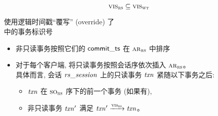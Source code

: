 \begin{frame}{}
  \begin{lemma}
	\[
	  \textsc{vis}_{\textsc{rs}} \subseteq \textsc{vis}_{\textsc{wt}}
	\]
  \end{lemma}

  \vspace{0.50cm}
  \begin{center}
	\rsalg{} 使用逻辑时间戳``覆写'' (override) 了 \\[5pt]
	\wtalg{} 中的事务标识号
  \end{center}
\end{frame}

\begin{frame}{}
  \begin{definition}
	\begin{itemize}
	  \setlength{\itemsep}{10pt}
	  \item 非只读事务按照它们的 ${\sf commit\_ts}$ 在 $\textsc{ar}_{\textsc{rs}}$ 中排序
	  \item 对于每个客户端, 将只读事务按照会话序依次插入 $\textsc{ar}_{\textsc{rs}}$。\\[5pt]
	    具体而言, 会话 $\mathit{rs\_session}$ 上的只读事务 $\mathit{txn}$ 紧随以下事务之后: \\[5pt]
	    \begin{itemize}
		  \setlength{\itemsep}{5pt}
		  \item $\mathit{txn}$ 在 $\textsc{so}_{\textsc{rs}}$ 序下的前一个事务 (如果有),
		  \item 非只读事务 $\mathit{txn}'$ 满足 $\mathit{txn}' \xrightarrow{\textsc{vis}_{\textsc{rs}}} \mathit{txn}$。
		\end{itemize}
	\end{itemize}
  \end{definition}
\end{frame}
